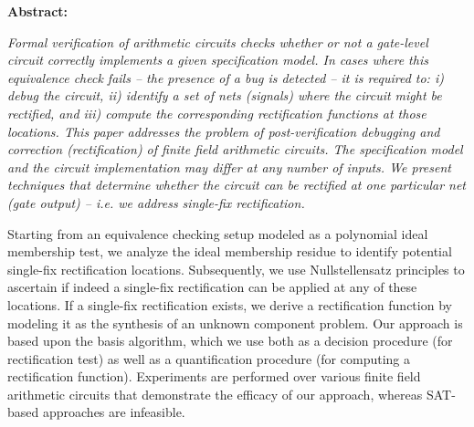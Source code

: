 {\bf Abstract:} {\it Formal verification of arithmetic circuits checks
  whether or not a 
gate-level circuit correctly implements a given specification
model. In cases where this equivalence check fails -- 
the presence of a bug is detected -- it is required to:
i) debug the circuit, ii) identify a set of nets (signals) where the
circuit might be rectified, and iii) compute the corresponding
rectification functions at those locations. This paper addresses the
problem of post-verification debugging and correction (rectification)
of finite field arithmetic circuits. The specification model and the
circuit implementation may differ at any number of inputs. We present
techniques that determine whether the circuit can be rectified at one
particular net (gate output) -- i.e. we address single-fix rectification.

Starting from an equivalence checking setup modeled as a polynomial
ideal membership test, we analyze the ideal membership residue to
identify potential single-fix rectification locations. Subsequently,
we use Nullstellensatz principles to ascertain if indeed a single-fix
rectification can be applied at any of these locations. If a
single-fix rectification exists, we derive a rectification function by
modeling it as the synthesis of an unknown component problem. Our
approach is based upon the \Grobner basis algorithm, which we use both
as a decision procedure (for rectification test) as well as a
quantification procedure (for computing a rectification
function). Experiments are performed over various finite field
arithmetic circuits that demonstrate the efficacy of our approach,
whereas SAT-based approaches are infeasible. 
}
